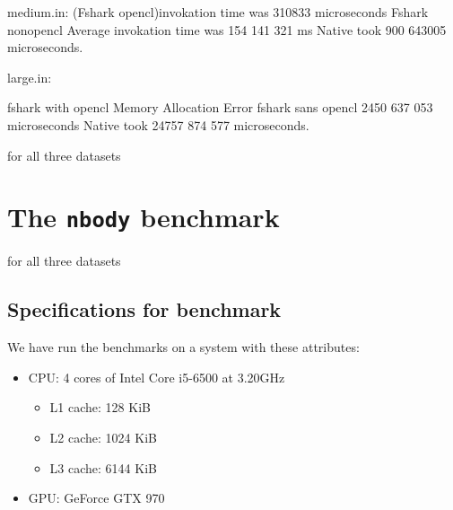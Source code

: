 medium.in:
(Fshark opencl)invokation time was 310833 microseconds
Fshark nonopencl Average invokation time was 154 141 321 ms
Native took 900 643005 microseconds.

large.in:

fshark with opencl Memory Allocation Error
fshark sans opencl 2450 637 053 microseconds
Native took 24757 874 577 microseconds.


for all three datasets



\section*{The \texttt{nbody} benchmark}

for all three datasets


\subsection*{Specifications for benchmark}
We have run the benchmarks on a system with these attributes:
\begin{itemize}
\item CPU: 4 cores of Intel Core i5-6500 at 3.20GHz
  \begin{itemize}
  \item L1 cache: 128 KiB 
  \item L2 cache: 1024 KiB 
  \item L3 cache: 6144 KiB 
  \end{itemize}
\item GPU: GeForce GTX 970
\end{itemize}


